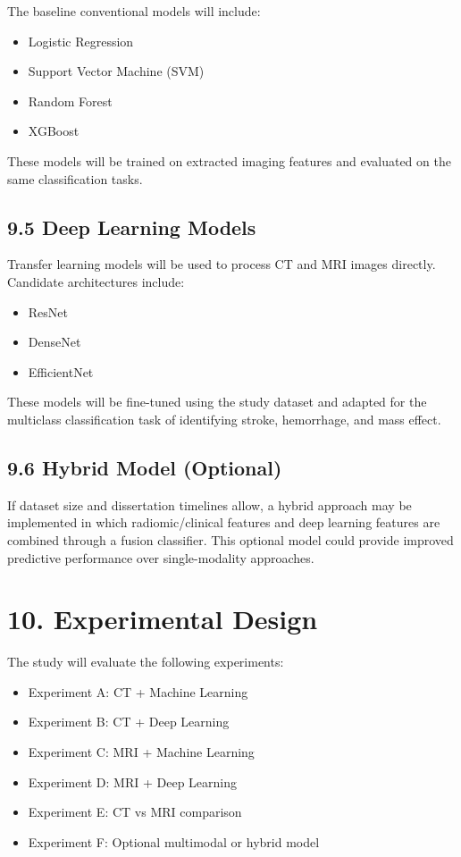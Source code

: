 \documentclass[12pt,a4paper]{report}
\begin{document}
The baseline conventional models will include:

\begin{itemize}
\item Logistic Regression
\item Support Vector Machine (SVM)
\item Random Forest
\item XGBoost
\end{itemize}

These models will be trained on extracted imaging features and evaluated on the same classification tasks.

\subsection{9.5 Deep Learning Models}

Transfer learning models will be used to process CT and MRI images directly. Candidate architectures include:

\begin{itemize}
\item ResNet
\item DenseNet
\item EfficientNet
\end{itemize}

These models will be fine-tuned using the study dataset and adapted for the multiclass classification task of identifying stroke, hemorrhage, and mass effect.

\subsection{9.6 Hybrid Model (Optional)}

If dataset size and dissertation timelines allow, a hybrid approach may be implemented in which radiomic/clinical features and deep learning features are combined through a fusion classifier. This optional model could provide improved predictive performance over single-modality approaches.


\section{10. Experimental Design}

The study will evaluate the following experiments:

\begin{itemize}
\item Experiment A: CT + Machine Learning
\item Experiment B: CT + Deep Learning
\item Experiment C: MRI + Machine Learning
\item Experiment D: MRI + Deep Learning
\item Experiment E: CT vs MRI comparison
\item Experiment F: Optional multimodal or hybrid model
\end{itemize}
\end{document}
